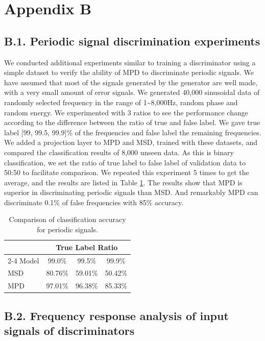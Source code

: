 \newpage
\label{app-b}
\section*{Appendix B}
\label{app-b1}
\subsection*{B.1. Periodic signal discrimination experiments}
We conducted additional experiments similar to training a discriminator using a simple dataset to verify the ability of MPD to discriminate periodic signals.
We have assumed that most of the signals generated by the generator are well made, with a very small amount of error signals.
We generated 40,000 sinusoidal data of randomly selected frequency in the range of 1\textasciitilde8,000Hz, random phase and random energy. We experimented with 3 ratios to see the performance change according to the difference between the ratio of true and false label. We gave true label [99, 99.5, 99.9]\% of the frequencies and false label the remaining frequencies. We added a projection layer to MPD and MSD, trained with these datasets, and compared the classification results of 8,000 unseen data. As this is binary classification, we set the ratio of true label to false label of validation data to 50:50 to facilitate comparison. We repeated this experiment 5 times to get the average, and the results are listed in Table \ref{tab:appendix-exp1}. The results show that MPD is superior in discriminating periodic signals than MSD. And remarkably MPD can discriminate 0.1\% of false frequencies with 85\% accuracy.
\begin{table}[h]
  \protect\caption{Comparison of classification accuracy for periodic signals.}
  \label{tab:appendix-exp1}
  \centering
  \begin{tabular}[htbp]{lccc}
    \toprule
    &\multicolumn{3}{c}{True Label Ratio}\\
    \cmidrule(r){2-4} 
    Model   & 99.0\% & 99.5\% & 99.9\% \\
    \midrule
    MSD    & 80.76\% & 59.01\% & 50.42\% \\
    MPD    & 97.01\% & 96.38\% & 85.33\% \\
    \bottomrule
  \end{tabular}
\end{table}

\subsection*{B.2. Frequency response analysis of input signals of discriminators}
\label{app-b2}

